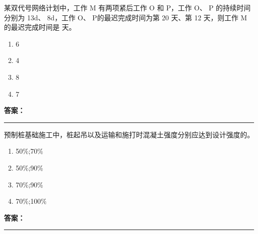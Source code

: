 \documentclass[UTF8,fontset=fandol,11pt]{ctexart}
\newcommand{\answerline}{\textcolor{answerred}{\rule{2.4cm}{0.7pt}}}
\begin{document}
\begin{quizbox}[title={乱序第 44 题｜第十一章网络计划技术}]

某双代号网络计划中，工作 M 有两项紧后工作 O 和 P，工作 O、 P 的持续时间分别为 13d、 8d，工作 O、 P的最迟完成时间为第 20 天、第 12 天，则工作 M 的最迟完成时间是 天。\\

\begin{enumerate}[label=\Alph*.]

\item 6

\item 4

\item 8

\item 7

\end{enumerate}

\textbf{\textcolor{answerred}{答案：}} \answerline

\end{quizbox}

\vspace{0.2em}

\begin{quizbox}[title={乱序第 45 题｜第二章桩基础工程}]

预制桩基础施工中，桩起吊以及运输和施打时混凝土强度分别应达到设计强度的。\\

\begin{enumerate}[label=\Alph*.]

\item 50\%;70\%

\item 50\%;90\%

\item 70\%;90\%

\item 70\%;100\%

\end{enumerate}

\textbf{\textcolor{answerred}{答案：}} \answerline

\end{quizbox}

\vspace{0.2em}
\end{document}
